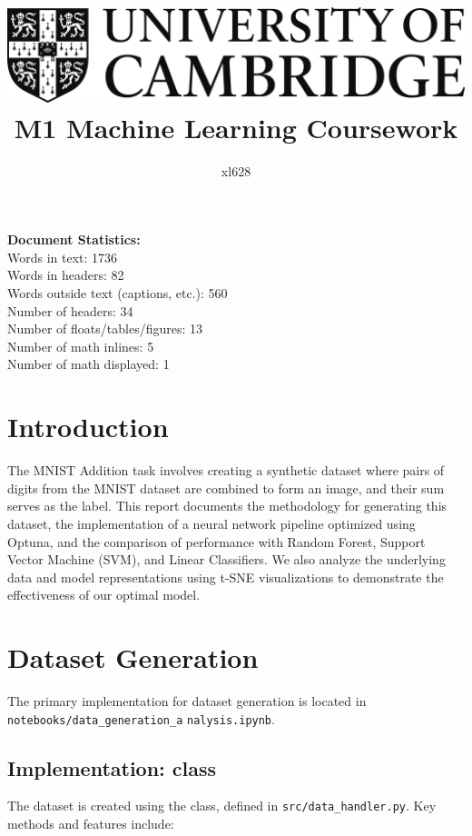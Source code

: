 \documentclass{article}
\title{
\includegraphics[scale=0.2]{Cam_logo_bw.png}\\
\vspace{0.5cm}
M1 Machine Learning Coursework
}
\author{xl628}
\affil{Department of Physics, University of Cambridge}
\begin{document}
\maketitle

\vspace{1cm}
\noindent
\textbf{Document Statistics:} \\
Words in text: 1736 \\
Words in headers: 82 \\
Words outside text (captions, etc.): 560 \\
Number of headers: 34 \\
Number of floats/tables/figures: 13 \\
Number of math inlines: 5 \\
Number of math displayed: 1


\section{Introduction}
The MNIST Addition task involves creating a synthetic dataset where pairs of digits from the MNIST dataset are combined to form an image, and their sum serves as the label. This report documents the methodology for generating this dataset, the implementation of a neural network pipeline optimized using Optuna, and the comparison of performance with Random Forest, Support Vector Machine (SVM), and Linear Classifiers. We also analyze the underlying data and model representations using t-SNE visualizations to demonstrate the effectiveness of our optimal model.

\section{Dataset Generation}

The primary implementation for dataset generation is located in \texttt{notebooks/data\_generation\_a} \texttt{nalysis.ipynb}.

\subsection{Implementation:  class}

The dataset is created using the  class, defined in \texttt{src/data\_handler.py}. Key methods and features include:
\end{document}
